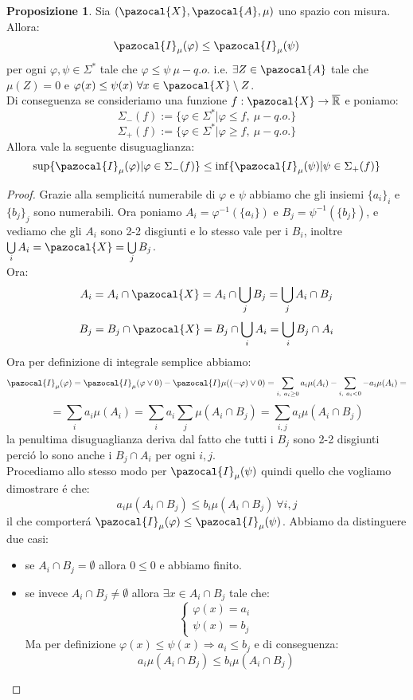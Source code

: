 \documentclass[11pt,a4paper]{report}
\theoremstyle{plain}
\theoremstyle{definition}
\newtheorem{prop}[thm]{Proposizione} %
\newcommand{\X}{\pazocal{X}}
\newcommand{\I}{\pazocal{I}}
\newcommand{\A}{\pazocal{A}}
\begin{document}
\begin{prop}
	Sia $(\X,\A,\mu)$ uno spazio con misura. Allora:
	\[
			\I_\mu(\varphi) \le \I_\mu(\psi)
	\]
	per ogni $\varphi, \psi \in \Sigma^*$ tale che $\varphi \le \psi\ \mu-q.o.$ i.e.  $\exists Z \in \A$ tale che $\mu(Z) = 0$ e $\varphi(x) \le \psi(x)\ \forall x \in  \X \setminus Z$.\\
	Di conseguenza se consideriamo una funzione $f : \X \rightarrow \overline{\mathbb{R}}$ e poniamo:
	\[
		\Sigma_-(f) := \{\varphi \in \Sigma^* | \varphi \le f,\ \mu-q.o.\}
	\]
	\[
		\Sigma_+(f) := \{\varphi \in \Sigma^* | \varphi \ge f,\ \mu-q.o.\}
	\]
	Allora vale la seguente disuguaglianza:
	\[
		\sup\{\I_\mu(\varphi) | \varphi \in \Sigma_-(f)\} \le	 \inf\{\I_\mu(\psi) | \psi \in \Sigma_+(f)\}
	\]
\end{prop}
\begin{proof}
	Grazie alla semplicit\'a numerabile di $\varphi$ e $\psi$ abbiamo che gli insiemi $\{a_i\}_i$ e $\{b_j\}_j$ sono numerabili. Ora poniamo $A_i = \varphi^{-1}(\{a_i\})$ e $B_j = \psi^{-1}(\{b_j\})$, e vediamo che gli $A_i$ sono 2-2 disgiunti e lo stesso vale per i $B_i$, inoltre $\bigcup\limits_i A_i = \X = \bigcup\limits_j B_j$.\\
	Ora:
	\[
	A_i = A_i \cap \X = A_i \cap \bigcup\limits_j B_j = \bigcup\limits_j A_i \cap B_j
	\]
	\[
		B_j = B_j \cap \X = B_j \cap \bigcup\limits_i A_i = \bigcup\limits_i B_j \cap A_i		
	\]
	Ora per definizione di integrale semplice abbiamo:
	\[
		\I_\mu(\varphi) = \I_\mu(\varphi \vee 0) - \I\mu((-\varphi) \vee 0) = \sum\limits_{i,\ a_i \ge 0}a_i\mu(A_i) - \sum\limits_{i,\ a_i < 0}-a_i\mu(A_i) =
	\]
	\[
		= \sum\limits_ia_i\mu(A_i) = \sum\limits_ia_i\sum\limits_j\mu(A_i \cap B_j) = \sum\limits_{i,j}a_i\mu(A_i \cap B_j)	
	\]
	la penultima disuguaglianza deriva dal fatto che tutti i $B_j$ sono 2-2 disgiunti  perci\'o lo sono anche i $B_j \cap A_i$ per ogni $i,j$.\\ Procediamo allo stesso modo per $\I_\mu(\psi)$ quindi quello che vogliamo dimostrare \'e che:
	\[
			a_i\mu(A_i \cap B_j) \le b_i\mu(A_i \cap B_j)\ \forall i,j
	\]
	il che comporter\'a $\I_\mu(\varphi) \le \I_\mu(\psi)$. Abbiamo da distinguere due casi:
	\begin{itemize}
		\item se $A_i \cap B_j = \emptyset$ allora $0 \le 0$ e abbiamo finito.
		\item se invece $A_i \cap B_j \ne \emptyset$ allora $\exists x \in A_i \cap B_j$ tale che:
		\[
			\begin{cases}
				\varphi(x) = a_i\\
				\psi(x) = b_j
			\end{cases}
		\]
		Ma per definizione $\varphi(x) \le \psi(x) \Rightarrow a_i \le b_j$ e di conseguenza:
		\[
			a_i\mu(A_i \cap B_j) \le b_i\mu(A_i \cap B_j)
		\]
	\end{itemize}
\end{proof}
\end{document}
